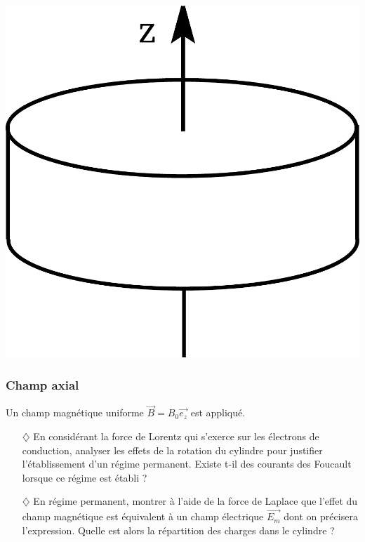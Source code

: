 \documentclass{report}
\begin{document}
\begin{center}
	\includegraphics[scale=0.2]{Foucault.pdf}
\end{center}

\subsubsection*{Champ axial}

	Un champ magnétique uniforme $\vec{B}=B_{0}\vec{e_{z}}$ est appliqué.
	
	\begin{itemize}
	
		\item[$\diamondsuit$] En considérant la force de Lorentz qui s'exerce sur les électrons de conduction, analyser les effets de la rotation du cylindre pour justifier l'établissement d'un régime permanent. Existe t-il des courants des Foucault lorsque ce régime est établi ? 
		
	\item[$\diamondsuit$] En régime permanent, montrer à l'aide de la force de Laplace que l'effet du champ magnétique est équivalent à un champ électrique $\vec{E_m}$ dont on précisera l'expression. Quelle est alors la répartition des charges dans le cylindre ?
	
	\end{itemize}
	
\end{document}

